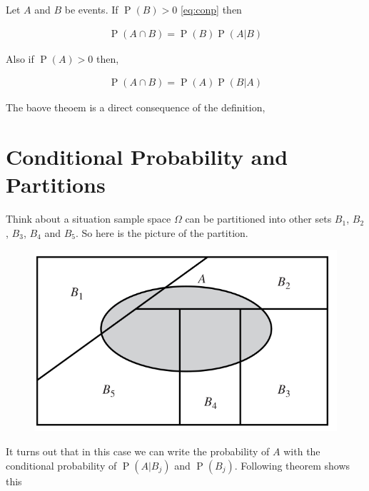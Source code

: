 \documentclass[ 11pt,%
				a4paper,%
				oneside,%
				headinclude,%
				footinclude = true,%
				cleardoublepage = empty,%
				reqno]{scrbook}
\begin{document}
\begin{theorem}

Let $A$ and $B$ be events. If $\operatorname{P}(B)>0$ \cref{eq:conp} then

\begin{align*}
	\operatorname{P}(A \cap B)=\operatorname{P}(B) \operatorname{P}(A | B) 
\end{align*}

Also if $\operatorname{P}(A)>0$ then, 

\begin{align*}
	 \operatorname{P}(A \cap B)=\operatorname{P}(A) \operatorname{P}(B | A)
\end{align*}

	
\end{theorem}


The baove theoem is a direct consequence of the definition,


\section{Conditional Probability and Partitions}

Think about a situation sample space $\Omega$ can be partitioned into other sets $B_1$, $B_2$, $B_3$, $B_4$ and $B_5$. So here is the picture of the partition.

\begin{figure}[H]
\begin{center}
\includegraphics[scale = .4]{images/partition.png}
\end{center}
	
\end{figure}

It turns out that in this case we can write the probability of $A$ with the conditional probability of $\operatorname{P}\left(A | B_{j}\right)$ and $\operatorname{P}\left(B_{j}\right)$. Following theorem shows this
\end{document}
